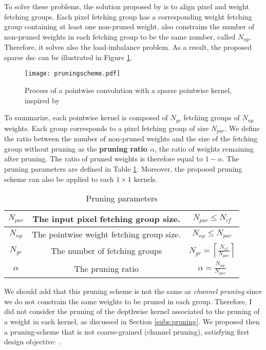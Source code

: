 To solve these problems, the solution proposed by \textcite{kang_accelerator-aware_2020} is to align pixel and weight fetching groups. Each pixel fetching group has a corresponding weight fetching group containing at least one non-pruned weight. \textcite{kang_accelerator-aware_2020} also constrains the number of non-pruned weights in each fetching group to be the same number, called $N_{np}$. Therefore, it solves also the load-imbalance problem. As a result, the proposed sparse \acrshort{dsc} can be illustrated in Figure \ref{fig:prunedwg}.
%
\begin{figure}[H]
    \centering
    \texttt{[image: pruningscheme.pdf]}
    \caption{Process of a pointwise convolution with a sparse pointwise kernel, inspired by \cite{kang_accelerator-aware_2020}}
    \label{fig:prunedwg}
\end{figure}
%
To summarize, each pointwise kernel is composed of $N_{gr}$ fetching groups of $N_{np}$ weights. Each group corresponds to a pixel fetching group of size $N_{par}$. We define the ratio between the number of non-pruned weights and the size of the fetching group without pruning as the \textbf{pruning ratio $\alpha$}, the ratio of weights remaining after pruning. The ratio of pruned weights is therefore equal to $1 - \alpha$. The pruning parameters are defined in Table \ref{tab:pr_param}. Moreover, the proposed pruning scheme can also be applied to each $1 \times 1$ kernels.
%
\begin{table}[H]
    \center
    \begin{tabular}{|c|c|c|}
        \hline
        $N_{par}$ & The input pixel fetching group size. & $N_{par} \leq N_{if}$ \\
        \hline
        $N_{np}$  & The pointwise weight fetching group size. & $N_{np} \leq N_{par}$ \\
        \hline
        $N_{gr}$  & The number of fetching groups & $N_{gr} = \left\lceil \frac{N_{if}}{N_{par}} \right\rceil $ \\
        \hline
        $\alpha$  & The pruning ratio & $\alpha = \frac{N_{np}}{N_{par}}  $ \\
        \hline
    \end{tabular}
    \caption{Pruning parameters}
    \label{tab:pr_param}
\end{table}
%
We should add that this pruning scheme is not the same as \textit{channel pruning} since we do not constrain the same weights to be pruned in each group. Therefore, I did not consider the pruning of the depthwise kernel associated to the pruning of a weight in each kernel, as discussed in Section \ref{subs:pruning}. We proposed then a pruning-scheme that is not coarse-grained (channel pruning), satisfying first design objective: \textbf{}.
%
